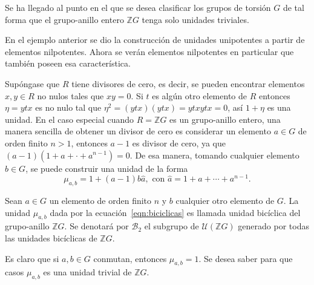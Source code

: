 Se ha llegado al punto en el que se desea clasificar los grupos de torsión $G$ de tal forma que el grupo-anillo entero $\mathds{Z}G$ tenga solo unidades triviales.

\begin{ejemplo}
En el ejemplo anterior se dio la construcción de unidades unipotentes a partir de elementos nilpotentes. Ahora se verán elementos nilpotentes en particular que también poseen esa característica. 

Supóngase que $R$ tiene divisores de cero, es decir, se pueden encontrar elementos $x,y \in R$ no nulos tales que $xy = 0$. Si $t$ es algún otro elemento de $R$ entonces $\eta =ytx$ es no nulo tal que $\eta ^2 = (ytx)(ytx) = ytxytx = 0$, así $1+\eta$ es una unidad. En el caso especial cuando $R =\mathds{Z}G$ es un grupo-anillo entero, una manera sencilla de obtener un divisor de cero es considerar un elemento $a \in G$ de orden finito $ n >1$, entonces $a-1$ es divisor de cero, ya que $(a-1)(1+a+\cdot+a^{n-1})=0$. De esa manera, tomando cualquier elemento $b \in G$, se puede construir una unidad de la forma 
\begin{equation}\label{eqn:biciclicas}
\mu_{a,b} = 1+(a-1)b\hat{a}, \mbox{ con } \hat{a} = 1+a+\cdots+a^{n-1}.
\end{equation}
\end{ejemplo}
\begin{definicion}
Sean $a \in G$ un elemento de orden finito $n$ y $b$ cualquier otro elemento de $G$. La unidad $\mu_{a,b}$ dada por la ecuación~\eqref{eqn:biciclicas} es llamada unidad bicíclica del grupo-anillo $\mathds{Z}G$. Se denotará por $\mathcal{B}_2$ el subgrupo de $\mathcal{U}(\mathds{Z}G)$ generado por todas las unidades bicíclicas de $\mathds{Z}G$.
\end{definicion}

Es claro que si $a,b \in G$ conmutan, entonces $\mu_{a,b} = 1$. Se desea saber para que casos $\mu_{a,b}$ es una unidad trivial de $\mathds{Z}G$.


